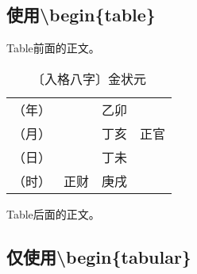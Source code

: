 \documentclass[a5paper,oneside,12pt]{ctexbook}
\begin{document}
\subsection{使用{\textbackslash}begin{\{table\}}}
Table前面的正文。

\begin{table}[H] %
\setlength{\abovecaptionskip}{0em} %
\captionsetup{labelformat=empty,justification=raggedright,singlelinecheck=false,indention=2em} %
\caption{〔入格八字〕金状元}
\setlength{\tabcolsep}{0em} %
\begin{tabular}{|m{5em}<{\raggedleft}|m{2.5em}<{\raggedleft}|c|c|} %
\hline
（年）&&乙卯&\\
（月）&&丁亥&\scriptsize{正官}\\
（日）&&丁未&\\
（时）&\scriptsize{正财}&庚戌&\\
\hline
\end{tabular}
\end{table}
Table后面的正文。

\subsection{仅使用{\textbackslash}begin{\{tabular\}}}
\end{document}
